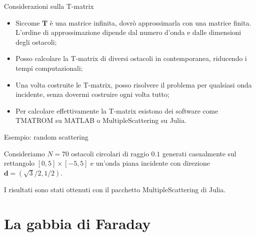 \documentclass{beamer}
\newcommand{\bd}{{\mathbf d}}
\begin{document}
	\begin{frame}{Considerazioni sulla T-matrix}
		\begin{block}{}
			\begin{itemize}
				\item Siccome $\mathbf{T}$ è una matrice infinita, dovrò approssimarla con una matrice finita. L'ordine di approssimazione dipende dal numero d'onda e dalle dimensioni degli ostacoli;
				\item  Posso calcolare la T-matrix di diversi ostacoli in contemporanea, riducendo i tempi computazionali;
				\item Una volta costruite le T-matrix, posso risolvere il problema per qualsiasi onda incidente, senza dovermi costruire ogni volta tutto;
				\item Per calcolare effettivamente la T-matrix esistono dei software come \textrm{TMATROM} su MATLAB o \textrm{MultipleScattering} su Julia.
			\end{itemize}
		\end{block}
	\end{frame}
	
	\begin{frame}{Esempio: random scattering}
		\begin{small}
		\begin{block}{}
			Consideriamo $N=70$ ostacoli circolari di raggio $0.1$ generati casualmente sul rettangolo $[0,5] \times [-5,5]$ e un'onda piana incidente con direzione $\bd=(\sqrt{3}/2, 1/2)$.
			
			I risultati sono stati ottenuti con il pacchetto \textrm{MultipleScattering} di Julia.
		\end{block} 
		\begin{figure}
		\end{figure}
		\end{small}
	\end{frame}
	
	\section{La gabbia di Faraday}
	\sectionpage
	
\end{document}

